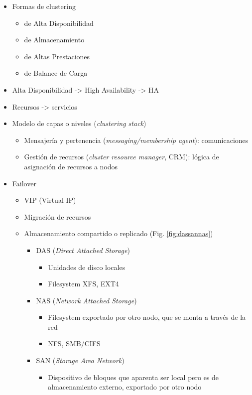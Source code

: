 \begin{itemize}
	\item Formas de clustering
	\begin{itemize}
		\item de Alta Disponibilidad
		\item de Almacenamiento
		\item de Altas Prestaciones
		\item de Balance de Carga
	\end{itemize}
	\item Alta Disponibilidad -> High Availability -> HA 
	\item Recursos ->  servicios
	\item Modelo de capas o niveles (\textit{clustering stack})
	\begin{itemize}
		\item Mensajería y pertenencia (\textit{messaging/membership agent}): comunicaciones
		\item Gestión de recursos (\textit{cluster resource manager}, CRM): lógica de asignación de recursos a nodos 
	\end{itemize}
	\item Failover
	\begin{itemize}
		\item VIP (Virtual IP)
		\item Migración de recursos
		\item Almacenamiento compartido o replicado (Fig. \ref{fig:dassannas})
		\begin{itemize}
			\item DAS (\textit{Direct Attached Storage})
			\begin{itemize}
				\item Unidades de disco locales
			    \item Filesystem XFS, EXT4
			\end{itemize}
			\item NAS (\textit{Network Attached Storage})
			\begin{itemize}
				\item Filesystem exportado por otro nodo, que se monta a través de la red
				\item NFS, SMB/CIFS
			\end{itemize}
			\item SAN (\textit{Storage Area Network})
			\begin{itemize}
				\item Dispositivo de bloques que aparenta ser local pero es de almacenamiento externo, exportado por otro nodo

\end{itemize}
\end{itemize}
\end{itemize}
\end{itemize}
